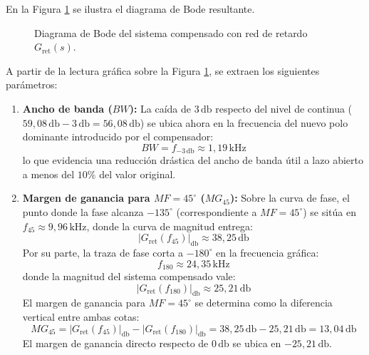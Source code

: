 En la Figura \ref{fig.ej2:bode_retardo} se ilustra el diagrama de Bode resultante.

\begin{figure}[!ht]
    \centering
    
    \caption{Diagrama de Bode del sistema compensado con red de retardo $G_{\text{ret}}(s)$.}
    \label{fig.ej2:bode_retardo}
\end{figure}

A partir de la lectura gráfica sobre la Figura \ref{fig.ej2:bode_retardo}, se extraen los siguientes parámetros:

\begin{enumerate}
    \item \textbf{Ancho de banda ($BW$):} La caída de $3\,\si{\decibel}$ respecto del nivel de continua ($59,08\,\si{\decibel} - 3\,\si{\decibel} = 56,08\,\si{\decibel}$)
    se ubica ahora en la frecuencia del nuevo polo dominante introducido por el compensador:
    \begin{equation}
        BW = f_{-3\,\si{\decibel}} \approx 1,19\,\si{\kilo\hertz}
    \end{equation}
    lo que evidencia una reducción drástica del ancho de banda útil a lazo abierto a menos del $10\%$ del valor original.

    \item \textbf{Margen de ganancia para $MF = 45^\circ$ ($MG_{45}$):} Sobre la curva de fase, el punto donde la fase
    alcanza $-135^\circ$ (correspondiente a $MF = 45^\circ$) se sitúa en $f_{45} \approx 9,96\,\si{\kilo\hertz}$, donde la curva
    de magnitud entrega:
    \begin{equation}
        |G_{\text{ret}}(f_{45})|_{\si{\decibel}} \approx 38,25\,\si{\decibel}
    \end{equation}
    Por su parte, la traza de fase corta a $-180^\circ$ en la frecuencia gráfica:
    \begin{equation}
        f_{180} \approx 24,35\,\si{\kilo\hertz}
    \end{equation}
    donde la magnitud del sistema compensado vale:
    \begin{equation}
        |G_{\text{ret}}(f_{180})|_{\si{\decibel}} \approx 25,21\,\si{\decibel}
    \end{equation}
    El margen de ganancia para $MF = 45^\circ$ se determina como la diferencia vertical entre ambas cotas:
    \begin{equation}
        MG_{45} = |G_{\text{ret}}(f_{45})|_{\si{\decibel}} - |G_{\text{ret}}(f_{180})|_{\si{\decibel}} = 38,25\,\si{\decibel} - 25,21\,\si{\decibel} = 13,04\,\si{\decibel}
    \end{equation}
    El margen de ganancia directo respecto de $0\,\si{\decibel}$ se ubica en $-25,21\,\si{\decibel}$.
\end{enumerate}

